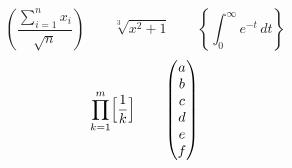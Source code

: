 \documentclass{article}
\begin{document}
\[ \left(\frac{\sum_{i=1}^{n} x_i}{\sqrt{n}}\right) \qquad \sqrt[3]{x^2+1} \qquad \left\{\int_0^\infty e^{-t}\,dt\right\} \]
\[ \prod_{k=1}^{m}\Bigl[\frac{1}{k}\Bigr] \qquad
   \left(\begin{matrix} a\\ b\\ c\\ d\\ e\\ f \end{matrix}\right) \]
\end{document}
